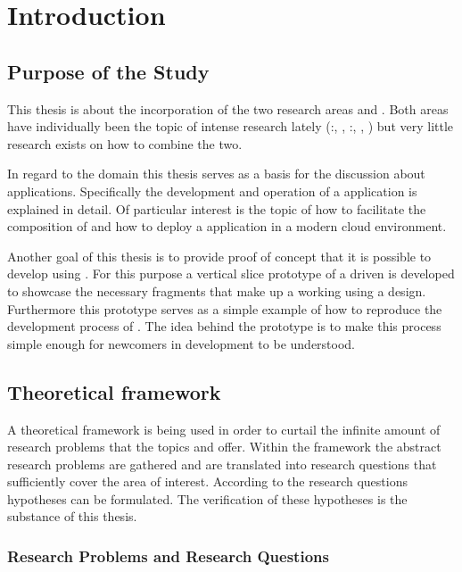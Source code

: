 \chapter{Introduction}

\section{Purpose of the Study}

This thesis is about the incorporation of the two research areas \mss{} and
\ogs{}. Both areas have individually been the topic of intense research lately
(\mss{}:\cite{zimmermann2016microservices}, \cite{di2017research},
\ogs{}:\cite{bosch2017towards}, \cite{smed2017algorithms},
\cite{liu2017apparatus}) but very little research exists on how to combine the
two.

In regard to the \mss{} domain this thesis serves as a basis for the discussion
about \ms{} applications. Specifically the development and operation of a \ms{}
application is explained in detail. Of particular interest is the topic of how
to facilitate the composition of \mss{} and how to deploy a \ms{} application in
a modern cloud environment.

Another goal of this thesis is to provide proof of concept that it is possible
to develop \ogs{} using \mss{}. For this purpose a vertical slice prototype of a
\ms{} driven \og{} is developed to showcase the necessary fragments that make up
a working \og{} using a \ms{} design. Furthermore this prototype serves as a
simple example of how to reproduce the development process of \ogs{}. The idea
behind the prototype is to make this process simple enough for newcomers in
\og{} development to be understood.


\section{Theoretical framework}

A theoretical framework is being used in order to curtail the infinite amount of
research problems that the topics \ogs{} and \mss{} offer. Within the framework
the abstract research problems are gathered and are translated into research
questions that sufficiently cover the area of interest. According to the
research questions hypotheses can be formulated. The verification of these
hypotheses is the substance of this thesis.

\subsection{Research Problems and Research Questions}
\label{sub:problems}

